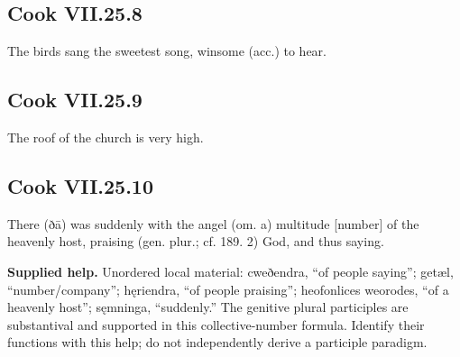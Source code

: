 \par\begin{minipage}{\linewidth}\raggedright
\subsection*{Cook VII.25.8}

The birds sang the sweetest song, winsome (acc.) to hear.

\end{minipage}\par\addvspace{4pt}

\par\begin{minipage}{\linewidth}\raggedright
\subsection*{Cook VII.25.9}

The roof of the church is very high.

\end{minipage}\par\addvspace{4pt}

\par\begin{minipage}{\linewidth}\raggedright
\subsection*{Cook VII.25.10}

There (ðā) was suddenly with the angel (om. a) multitude [number] of the heavenly host, praising (gen. plur.; cf. 189. 2) God, and thus saying.

\end{minipage}\par\addvspace{4pt}

\textbf{Supplied help.} Unordered local material: cweðendra, “of people saying”; getæl, “number/\allowbreak{}company”; hęriendra, “of people praising”; heofonlices weorodes, “of a heavenly host”; sęmninga, “suddenly.” The genitive plural participles are substantival and supported in this collective-number formula. Identify their functions with this help; do not independently derive a participle paradigm.

